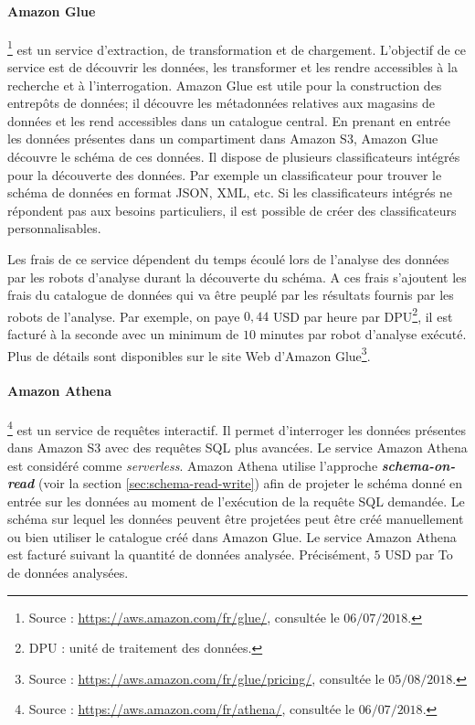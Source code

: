 \paragraph{Amazon  Glue} \label{aws:glue}
\footnote{Source : \url{https://aws.amazon.com/fr/glue/}, consultée le $06/07/2018$.} est un service d'extraction, de transformation et de chargement. L'objectif de ce service est de découvrir les données, les transformer et les rendre accessibles à la recherche et à l'interrogation.  Amazon Glue  est utile pour la construction des entrepôts de données; il découvre les métadonnées relatives aux magasins de données et les rend accessibles dans un catalogue central. En prenant en entrée les données  présentes dans un compartiment dans Amazon S3, Amazon Glue découvre le schéma de ces données. Il dispose de plusieurs classificateurs intégrés pour la découverte des données. Par exemple un classificateur pour trouver le schéma  de données en format JSON, XML, etc. Si les classificateurs intégrés ne répondent pas aux besoins particuliers, il est possible de créer des classificateurs personnalisables. 

Les frais de ce service dépendent du temps écoulé lors de l'analyse des données par les robots d'analyse durant la découverte du schéma. A ces frais s'ajoutent les frais du catalogue de données qui va être peuplé par les résultats fournis par les robots de l'analyse. Par exemple, on paye $ 0,44 $ USD par heure par DPU\footnote{DPU : unité de traitement des données.}, il est facturé à la seconde avec un minimum de $ 10 $ minutes par robot d'analyse exécuté. Plus de détails sont disponibles sur le site Web d'Amazon Glue\footnote{Source : \url{https://aws.amazon.com/fr/glue/pricing/}, consultée le $05/08/2018$.}.

\paragraph{Amazon Athena}\label{aws:athena}\footnote{Source : \url{https://aws.amazon.com/fr/athena/}, consultée le $06/07/2018$.} est un service de requêtes  interactif. Il permet d'interroger les données présentes dans Amazon S3 avec des requêtes SQL plus avancées. Le service Amazon Athena est considéré comme \textit{serverless}. Amazon Athena utilise l'approche \textbf{\textit{schema-on-read}} (voir la section \ref{sec:schema-read-write}) afin de projeter le schéma donné en entrée sur les données au moment de l'exécution de la requête SQL demandée. Le schéma sur lequel les données peuvent être projetées peut être créé manuellement ou bien utiliser le catalogue créé dans Amazon Glue.
Le service Amazon Athena est facturé suivant la quantité de données analysée. Précisément, $ 5 $ USD par To de données analysées.


